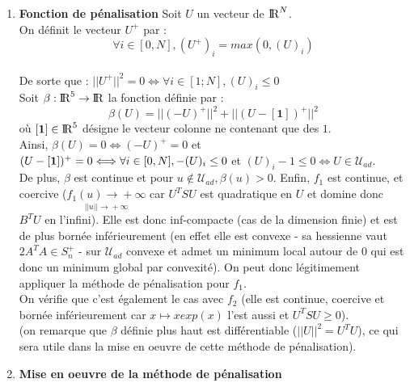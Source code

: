 \documentclass[a4paper]{article}
\begin{document}
\begin{enumerate}
\item \textbf{Fonction de pénalisation}
\vspace{0.1cm}
Soit $U$ un vecteur de ${\rm I\!R}^N$.
\\ On définit le vecteur $U^+$ par : 
\[ \forall i \in [0,N], (U^+)_i = max(0,(U)_i) \]
\\ De sorte que :  $||U^+||^2 = 0 \Longleftrightarrow{} \forall i \in [1;N], (U)_i \le 0$
\vspace{0.2cm}
\\ Soit $\beta : {\rm I\!R}^5 \rightarrow{} {\rm I\!R}$ la fonction définie par : 
\[ \beta(U) = ||(-U)^+||^2 + ||(U-[\textbf{1}])^+||^2 \]
où $[\textbf{1}] \in {\rm I\!R}^5$ désigne le vecteur colonne ne contenant que des $1$.
\vspace{0.2cm}
\\ Ainsi, $\beta(U) = 0 \Longleftrightarrow{} (-U)^+ = 0$ et $(U-[\textbf{1}])^+ = 0 \\ \Longleftrightarrow{} \forall i \in [0,N], -(U)_i \le 0$ et $(U)_i-1 \le 0 \Longleftrightarrow{} U \in \mathcal{U}_{ad}$.
\vspace{0.2cm}
\\ De plus, $\beta$ est continue et pour $ u \notin \mathcal{U}_{ad}, \beta(u) > 0$. Enfin, $f_1$ est continue, et coercive ($\underset{||u|| \rightarrow{} +\infty}{f_1(u) \rightarrow{}+\infty}$ car $U^TSU$ est quadratique en $U$ et domine donc $B^TU$ en l'infini). 
\newpage
Elle est donc inf-compacte (cas de la dimension finie) et est de plus bornée inférieurement (en effet elle est convexe - sa hessienne vaut $2A^TA \in S_n^+$  - sur $\mathcal{U}_{ad}$ convexe et admet un minimum local autour de $0$ qui est donc un minimum global par convexité). On peut donc légitimement appliquer la méthode de pénalisation pour $f_1$.
\vspace{0.2cm}
\\ On vérifie que c'est également le cas avec $f_2$ (elle est continue, coercive et bornée inférieurement car $x \mapsto xexp(x)$ l'est aussi et $U^TSU \ge 0$).
\vspace{0.2cm}
\\ (on remarque que $\beta$ définie plus haut est différentiable ($||U||^2 = U^T U$), ce qui sera utile dans la mise en oeuvre de cette méthode de pénalisation).


\item \textbf{Mise en oeuvre de la méthode de pénalisation}
\vspace{0.1cm}

\end{enumerate}
\end{document}
